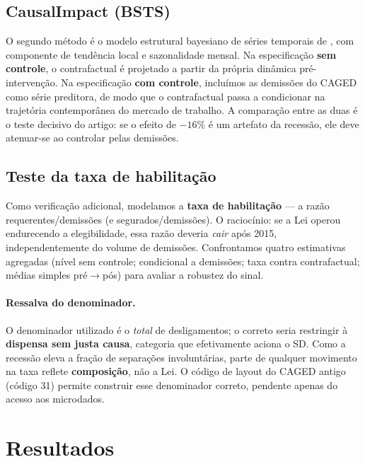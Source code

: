\documentclass[12pt,a4paper]{article}
\begin{document}
\subsection{CausalImpact (BSTS)}
O segundo método é o modelo estrutural bayesiano de séries temporais de \citet{brodersen2015causalimpact}, com componente de tendência local e sazonalidade mensal. Na especificação \textbf{sem controle}, o contrafactual é projetado a partir da própria dinâmica pré-intervenção. Na especificação \textbf{com controle}, incluímos as demissões do CAGED como série preditora, de modo que o contrafactual passa a condicionar na trajetória contemporânea do mercado de trabalho. A comparação entre as duas é o teste decisivo do artigo: se o efeito de $-16\%$ é um artefato da recessão, ele deve atenuar-se ao controlar pelas demissões.

\subsection{Teste da taxa de habilitação}
Como verificação adicional, modelamos a \textbf{taxa de habilitação} --- a razão requerentes/demissões (e segurados/demissões). O raciocínio: se a Lei operou endurecendo a elegibilidade, essa razão deveria \textit{cair} após 2015, independentemente do volume de demissões. Confrontamos quatro estimativas agregadas (nível sem controle; condicional a demissões; taxa contra contrafactual; médias simples pré$\to$pós) para avaliar a robustez do sinal.

\paragraph{Ressalva do denominador.} O denominador utilizado é o \textit{total} de desligamentos; o correto seria restringir à \textbf{dispensa sem justa causa}, categoria que efetivamente aciona o SD. Como a recessão eleva a fração de separações involuntárias, parte de qualquer movimento na taxa reflete \textbf{composição}, não a Lei. O código de layout do CAGED antigo (código 31) permite construir esse denominador correto, pendente apenas do acesso aos microdados.

\section{Resultados}
\end{document}
